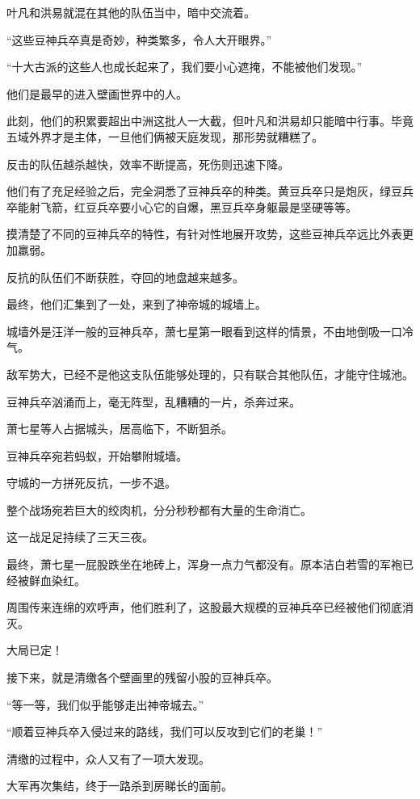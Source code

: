 \begin{this_body}
叶凡和洪易就混在其他的队伍当中，暗中交流着。

“这些豆神兵卒真是奇妙，种类繁多，令人大开眼界。”

“十大古派的这些人也成长起来了，我们要小心遮掩，不能被他们发现。”

他们是最早的进入壁画世界中的人。

此刻，他们的积累要超出中洲这批人一大截，但叶凡和洪易却只能暗中行事。毕竟五域外界才是主体，一旦他们俩被天庭发现，那形势就糟糕了。

反击的队伍越杀越快，效率不断提高，死伤则迅速下降。

他们有了充足经验之后，完全洞悉了豆神兵卒的种类。黄豆兵卒只是炮灰，绿豆兵卒能射飞箭，红豆兵卒要小心它的自爆，黑豆兵卒身躯最是坚硬等等。

摸清楚了不同的豆神兵卒的特性，有针对性地展开攻势，这些豆神兵卒远比外表更加羸弱。

反抗的队伍们不断获胜，夺回的地盘越来越多。

最终，他们汇集到了一处，来到了神帝城的城墙上。

城墙外是汪洋一般的豆神兵卒，萧七星第一眼看到这样的情景，不由地倒吸一口冷气。

敌军势大，已经不是他这支队伍能够处理的，只有联合其他队伍，才能守住城池。

豆神兵卒汹涌而上，毫无阵型，乱糟糟的一片，杀奔过来。

萧七星等人占据城头，居高临下，不断狙杀。

豆神兵卒宛若蚂蚁，开始攀附城墙。

守城的一方拼死反抗，一步不退。

整个战场宛若巨大的绞肉机，分分秒秒都有大量的生命消亡。

这一战足足持续了三天三夜。

最终，萧七星一屁股跌坐在地砖上，浑身一点力气都没有。原本洁白若雪的军袍已经被鲜血染红。

周围传来连绵的欢呼声，他们胜利了，这股最大规模的豆神兵卒已经被他们彻底消灭。

大局已定！

接下来，就是清缴各个壁画里的残留小股的豆神兵卒。

“等一等，我们似乎能够走出神帝城去。”

“顺着豆神兵卒入侵过来的路线，我们可以反攻到它们的老巢！”

清缴的过程中，众人又有了一项大发现。

大军再次集结，终于一路杀到房睇长的面前。


\end{this_body}
